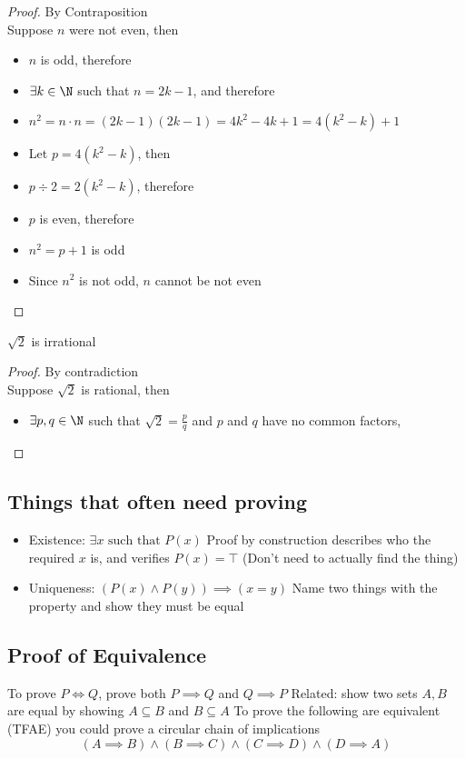 \begin{proof} By Contraposition \\
    Suppose $n$ were not even, then
    \begin{itemize}
        \item $n$ is odd, therefore
        \item $\exists k \in \N$ such that $n=2k-1$, and therefore
        \item $n^2=n\cdot n=(2k-1)(2k-1)=4k^2-4k+1=4(k^2-k)+1$
        \item Let $p=4(k^2-k)$, then
        \item $p\div2=2(k^2-k)$, therefore
        \item $p$ is even, therefore
        \item $n^2=p+1$ is odd
        \item Since $n^2$ is not odd, $n$ cannot be not even
    \end{itemize}
\end{proof}
\begin{proposition}
    $\sqrt{2}$ is irrational
\end{proposition}
\begin{proof}
    By contradiction \\
    Suppose $\sqrt{2}$ is rational, then
    \begin{itemize}
        \item $\exists p,q \in \N$ such that $\sqrt{2}=\frac{p}{q}$ and $p$ and $q$ have no common factors,
    \end{itemize}
\end{proof}
\subsection{Things that often need proving}
\begin{itemize}
    \item Existence: $\exists x \text{ such that } P(x)$ Proof by construction describes who the required $x$ is, and verifies $P(x)=\top$ (Don't need to actually find the thing)
    \item Uniqueness: $\left(P(x) \land P(y)\right) \implies (x=y)$ Name two things with the property and show they must be equal
\end{itemize}
\subsection{Proof of Equivalence}
To prove $P \iff Q$, prove both $P \implies Q$ and $Q \implies P$
Related: show two sets $A,B$ are equal by showing $A \subseteq B$ and $B \subseteq A$
To prove the following are equivalent (TFAE) you could prove a circular chain of implications
\[
\left(A \implies B\right) \land \left(B \implies C\right) \land \left(C \implies D\right) \land \left(D \implies A\right)
\]
